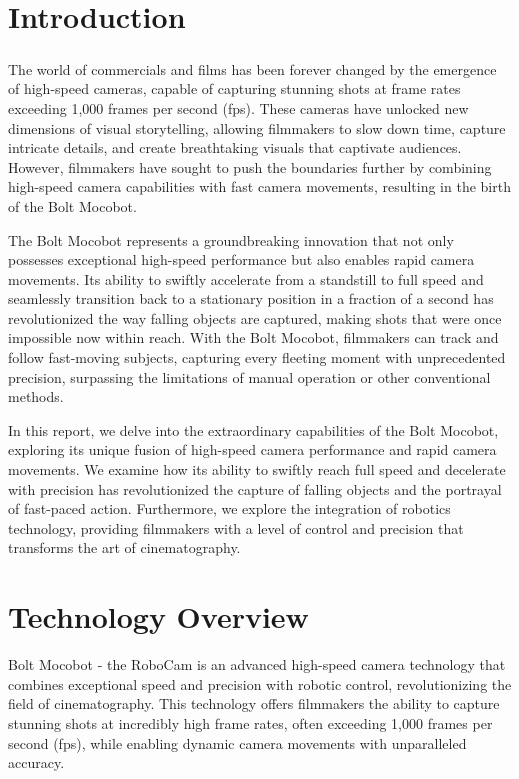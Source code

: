 \documentclass[a4paper,11pt]{report}
\begin{document}
  \tableofcontents
\thispagestyle{empty}

\chapter{Introduction}

\paragraph{}
The world of commercials and films has been forever changed by the emergence of high-speed cameras, capable of capturing stunning shots at frame rates exceeding 1,000 frames per second (fps). These cameras have unlocked new dimensions of visual storytelling, allowing filmmakers to slow down time, capture intricate details, and create breathtaking visuals that captivate audiences. However, filmmakers have sought to push the boundaries further by combining high-speed camera capabilities with fast camera movements, resulting in the birth of the Bolt Mocobot.

The Bolt Mocobot represents a groundbreaking innovation that not only possesses exceptional high-speed performance but also enables rapid camera movements. Its ability to swiftly accelerate from a standstill to full speed and seamlessly transition back to a stationary position in a fraction of a second has revolutionized the way falling objects are captured, making shots that were once impossible now within reach. With the Bolt Mocobot, filmmakers can track and follow fast-moving subjects, capturing every fleeting moment with unprecedented precision, surpassing the limitations of manual operation or other conventional methods.

In this report, we delve into the extraordinary capabilities of the Bolt Mocobot, exploring its unique fusion of high-speed camera performance and rapid camera movements. We examine how its ability to swiftly reach full speed and decelerate with precision has revolutionized the capture of falling objects and the portrayal of fast-paced action. Furthermore, we explore the integration of robotics technology, providing filmmakers with a level of control and precision that transforms the art of cinematography.
  

  
\chapter{Technology Overview}
Bolt Mocobot - the RoboCam is an advanced high-speed camera technology that combines exceptional speed and precision with robotic control, revolutionizing the field of cinematography. This technology offers filmmakers the ability to capture stunning shots at incredibly high frame rates, often exceeding 1,000 frames per second (fps), while enabling dynamic camera movements with unparalleled accuracy.
\end{document}
